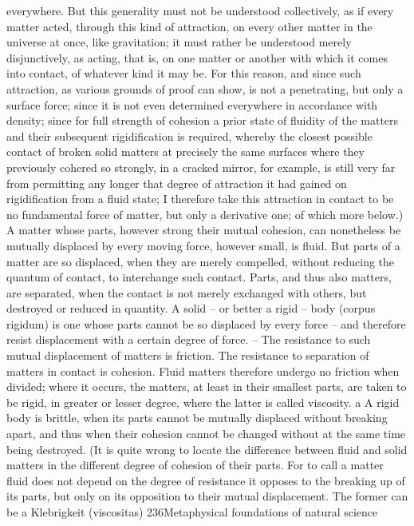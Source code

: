 everywhere. But this generality must not be understood collectively, as if
every matter acted, through this kind of attraction, on every other matter
in the universe at once, like gravitation; it must rather be understood
merely disjunctively, as acting, that is, on one matter or another with
which it comes into contact, of whatever kind it may be. For this reason,
and since such attraction, as various grounds of proof can show, is not
a penetrating, but only a surface force; since it is not even determined
everywhere in accordance with density; since for full strength of cohesion
a prior state of ﬂuidity of the matters and their subsequent rigidiﬁcation
is required, whereby the closest possible contact of broken solid matters
at precisely the same surfaces where they previously cohered so strongly,
in a cracked mirror, for example, is still very far from permitting any
longer that degree of attraction it had gained on rigidiﬁcation from a
ﬂuid state; I therefore take this attraction in contact to be no fundamental
force of matter, but only a derivative one; of which more below.) A
matter whose parts, however strong their mutual cohesion, can nonetheless be
mutually displaced by every moving force, however small, is ﬂuid. But parts of a
matter are so displaced, when they are merely compelled, without reducing the
quantum of contact, to interchange such contact. Parts, and thus also matters, are
separated, when the contact is not merely exchanged with others, but destroyed
or reduced in quantity. A solid – or better a rigid – body (corpus rigidum)
is one whose parts cannot be so displaced by every force – and therefore resist
displacement with a certain degree of force. – The resistance to such mutual
displacement of matters is friction. The resistance to separation of matters
in contact is cohesion. Fluid matters therefore undergo no friction when
divided; where it occurs, the matters, at least in their smallest parts, are
taken to be rigid, in greater or lesser degree, where the latter is called
viscosity. a A rigid body is brittle, when its parts cannot be mutually displaced
without breaking apart, and thus when their cohesion cannot be changed
without at the same time being destroyed. (It is quite wrong to locate
the difference between ﬂuid and solid matters in the different degree of
cohesion of their parts. For to call a matter ﬂuid does not depend on
the degree of resistance it opposes to the breaking up of its parts, but
only on its opposition to their mutual displacement. The former can be
a
Klebrigkeit (viscositas)
236Metaphysical foundations of natural science
